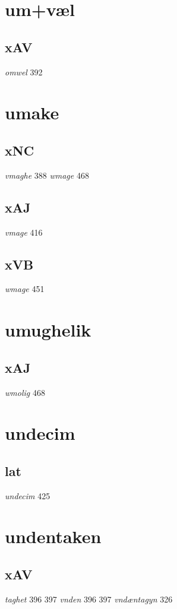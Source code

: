 \documentclass[a4paper,twocolumn]{article}
\begin{document}
\section{um+væl}
\label{sec:orgba5260c}
\subsection{xAV}
\label{sec:orga2c4403}
\emph{omwel} 392 
\section{umake}
\label{sec:orgc3cea26}
\subsection{xNC}
\label{sec:orgea4a547}
\emph{vmaghe} 388 \emph{wmage} 468 
\subsection{xAJ}
\label{sec:orge0950ad}
\emph{vmage} 416 
\subsection{xVB}
\label{sec:org0fbc5b3}
\emph{wmage} 451 
\section{umughelik}
\label{sec:org9b133df}
\subsection{xAJ}
\label{sec:org2ab008b}
\emph{wmolig} 468 
\section{undecim}
\label{sec:org2307f87}
\subsection{lat}
\label{sec:org9f210a7}
\emph{undecim} 425 
\section{undentaken}
\label{sec:org041148e}
\subsection{xAV}
\label{sec:org618d31f}
\emph{taghet} 396 397 \emph{vnden} 396 397 \emph{vndæntagyn} 326 
\end{document}
